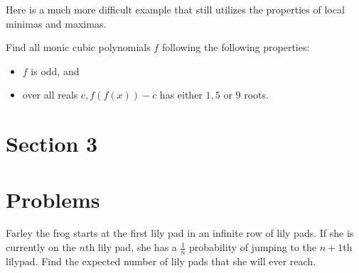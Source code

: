 \documentclass[mast]{lucky}
\begin{document}
Here is a much more difficult example that still utilizes the properties of local minimas and maximas.
\begin{exam}
Find all monic cubic polynomials $f$ following the following properties:
\begin{itemize}
\item $f$ is odd, and
\item over all reals $c, f(f(x))-c$ has either $1, 5$ or $9$ roots.
\end{itemize}
\end{exam}
\begin{walk}
\end{walk}
\section{Section 3}
\section{Problems}
\noindent{}

\begin{prob}[SMT 2021]{2}
Farley the frog starts at the first lily pad in an infinite row of lily pads. If she is currently on the $n$th lily pad, she has a $\frac{1}{n}$ probability of jumping to the $n+1$th lilypad. Find the expected number of lily pads that she will ever reach.
\end{prob}
\end{document}
